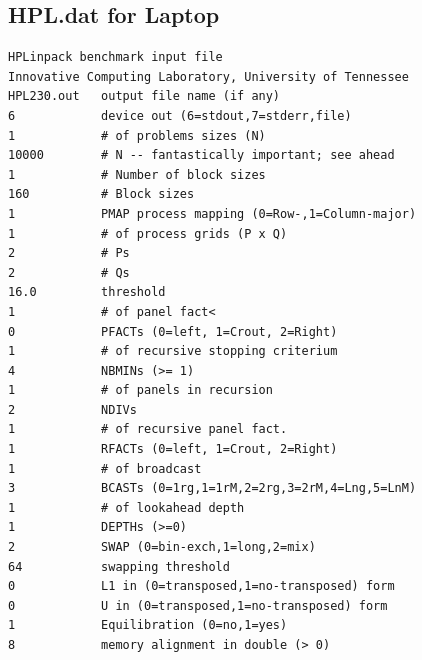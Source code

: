 \documentclass[10pt,twocolumn]{article}
\begin{document}
\begin{appendices}
\section{HPL.dat for Laptop}
\label{sec:appendixHPLdatLaptop}
\begin{lstlisting}
HPLinpack benchmark input file
Innovative Computing Laboratory, University of Tennessee
HPL230.out   output file name (if any)
6            device out (6=stdout,7=stderr,file)
1            # of problems sizes (N)
10000        # N -- fantastically important; see ahead
1            # Number of block sizes
160          # Block sizes
1            PMAP process mapping (0=Row-,1=Column-major)
1            # of process grids (P x Q)
2            # Ps
2            # Qs
16.0         threshold
1            # of panel fact<
0            PFACTs (0=left, 1=Crout, 2=Right)
1            # of recursive stopping criterium
4            NBMINs (>= 1)
1            # of panels in recursion
2            NDIVs
1            # of recursive panel fact.
1            RFACTs (0=left, 1=Crout, 2=Right)
1            # of broadcast
3            BCASTs (0=1rg,1=1rM,2=2rg,3=2rM,4=Lng,5=LnM)
1            # of lookahead depth
1            DEPTHs (>=0)
2            SWAP (0=bin-exch,1=long,2=mix)
64           swapping threshold
0            L1 in (0=transposed,1=no-transposed) form
0            U in (0=transposed,1=no-transposed) form
1            Equilibration (0=no,1=yes)
8            memory alignment in double (> 0)
\end{lstlisting}

\end{appendices}
\end{document}
